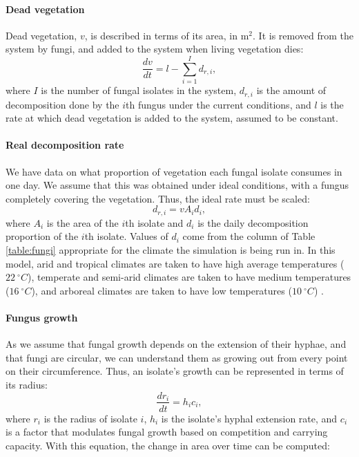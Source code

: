\documentclass[12pt]{article}
\begin{document}
\paragraph{Dead vegetation}
Dead vegetation, $v$, is described in terms of its area, in m$^2$. It is removed from the system by fungi, and added to the system when living vegetation dies:
\begin{equation*}\label{eq:de_v}
\frac{dv}{dt}=l-\sum_{i=1}^I d_{r,i},
\end{equation*}
where $I$ is the number of fungal isolates in the system, $d_{r,i}$ is the amount of decomposition done by the $i$th fungus under the current conditions, and $l$ is the rate at which dead vegetation is added to the system, assumed to be constant.








\paragraph{Real decomposition rate}
We have data on what proportion of vegetation each fungal isolate consumes in one day. We assume that this was obtained under ideal conditions, with a fungus completely covering the vegetation. Thus, the ideal rate must be scaled:
\begin{equation*}
d_{r,i}=vA_id_i,
\end{equation*}
where $A_i$ is the area of the $i$th isolate and $d_i$ is the daily decomposition proportion of the $i$th isolate. Values of $d_i$ come from the column of Table \ref{table:fungi} appropriate for the climate the simulation is being run in. In this model, arid and tropical climates are taken to have high average temperatures ($22 \ ^{\circ} C$), temperate and semi-arid climates are taken to have medium temperatures ($16 \ ^{\circ} C$), and arboreal climates are taken to have low temperatures ($10 \ ^{\circ} C$) \cite{koppen}.






\paragraph{Fungus growth}
As we assume that fungal growth depends on the extension of their hyphae, and that fungi are circular, we can understand them as growing out from every point on their circumference. Thus, an isolate's growth can be represented in terms of its radius:
\begin{equation*}
\frac{dr_i}{dt}=
h_i c_i,
\end{equation*}
where $r_i$ is the radius of isolate $i$, $h_i$ is the isolate's hyphal extension rate, and $c_i$ is a factor that modulates fungal growth based on competition and carrying capacity. With this equation, the change in area over time can be computed:
\end{document}
